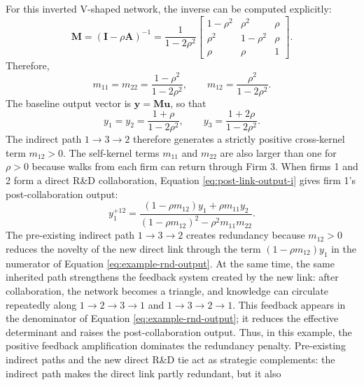 For this inverted V-shaped network, the inverse can be computed explicitly:
\begin{equation}
\mathbf{M}
=
\left(\mathbf{I}-\rho\mathbf{A}\right)^{-1}
=
\frac{1}{1-2\rho^2}
\begin{bmatrix}
1-\rho^2 & \rho^2 & \rho \\
\rho^2 & 1-\rho^2 & \rho \\
\rho & \rho & 1
\end{bmatrix}.
\label{eq:example-rnd-baseline-kernel}
\end{equation}
Therefore,
\begin{equation}
m_{11}
=
m_{22}
=
\frac{1-\rho^2}{1-2\rho^2},
\qquad
m_{12}
=
\frac{\rho^2}{1-2\rho^2}.
\label{eq:example-rnd-kernel-entries}
\end{equation}
The baseline output vector is
$
\mathbf{y}
=
\mathbf{M}\mathbf{u}$, 
so that
\begin{equation}
y_{1}
=
y_{2}
=
\frac{1+\rho}{1-2\rho^2},
\qquad
y_{3}
=
\frac{1+2\rho}{1-2\rho^2}.
\label{eq:example-rnd-baseline-output}
\end{equation}
The indirect path $1\to 3\to 2$ therefore generates a strictly positive cross-kernel
term $m_{12}>0$. The self-kernel terms $m_{11}$ and $m_{22}$ are also
larger than one for $\rho>0$ because walks from each firm can return through Firm 3. When firms 1 and 2 form a direct R\&D collaboration, Equation
\eqref{eq:post-link-output-i} gives firm 1's post-collaboration output:
\begin{equation}
y_{1}^{+12}
=
\frac{
(1-\rho m_{12})y_{1}
+
\rho m_{11}y_{2}
}{
(1-\rho m_{12})^2
-
\rho^2m_{11}m_{22}
}.
\label{eq:example-rnd-output}
\end{equation}
The pre-existing indirect path
$1\to 3\to 2$ creates redundancy because $m_{12}>0$ reduces the novelty of the
new direct link through the term $(1-\rho m_{12})y_{1}$ in the numerator of
Equation \eqref{eq:example-rnd-output}. At the same time, the same inherited path
strengthens the feedback system created by the new link: after collaboration, the
network becomes a triangle, and knowledge can circulate repeatedly along
$1\to 2\to 3\to 1$ and $1\to 3\to 2\to 1$. This feedback appears in the denominator
of Equation \eqref{eq:example-rnd-output}; it reduces the effective determinant and
raises the post-collaboration output. Thus, in this example, the positive feedback amplification dominates the redundancy
penalty. Pre-existing indirect paths and the new direct R\&D tie act as strategic
complements: the indirect path makes the direct link partly redundant, but it also
